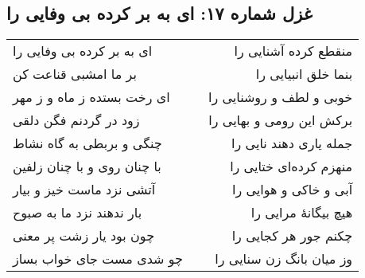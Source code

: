 \begin{center}
\section*{غزل شماره ۱۷: ای به بر کرده بی وفایی را}
\label{sec:017}
\begin{longtable}{l p{0.5cm} r}
ای به بر کرده بی وفایی را
&&
منقطع کرده آشنایی را
\\
بر ما امشبی قناعت کن
&&
بنما خلق انبیایی را
\\
ای رخت بستده ز ماه و ز مهر
&&
خوبی و لطف و روشنایی را
\\
زود در گردنم فگن دلقی
&&
برکش این رومی و بهایی را
\\
چنگی و بربطی به گاه نشاط
&&
جمله یاری دهند نایی را
\\
با چنان روی و با چنان زلفین
&&
منهزم کرده‌ای ختایی را
\\
آتشی نزد ماست خیز و بیار
&&
آبی و خاکی و هوایی را
\\
بار ندهند نزد ما به صبوح
&&
هیچ بیگانهٔ مرایی را
\\
چون بود یار زشت پر معنی
&&
چکنم جور هر کجایی را
\\
چو شدی مست جای خواب بساز
&&
وز میان بانگ زن سنایی را
\\
\end{longtable}
\end{center}
